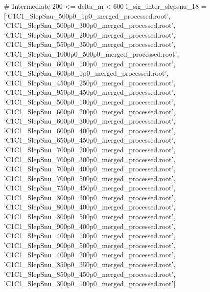 # Intermediate 200 <= delta_m < 600
l_sig_inter_slepsnu_18 = ['C1C1_SlepSnu_500p0_1p0_merged_processed.root',
                       'C1C1_SlepSnu_500p0_300p0_merged_processed.root',
                       'C1C1_SlepSnu_500p0_200p0_merged_processed.root',
                       'C1C1_SlepSnu_550p0_350p0_merged_processed.root',
                       'C1C1_SlepSnu_1000p0_500p0_merged_processed.root',
                       'C1C1_SlepSnu_600p0_100p0_merged_processed.root',
                       'C1C1_SlepSnu_600p0_1p0_merged_processed.root',
                       'C1C1_SlepSnu_450p0_250p0_merged_processed.root',
                       'C1C1_SlepSnu_950p0_450p0_merged_processed.root',
                       'C1C1_SlepSnu_500p0_100p0_merged_processed.root',
                       'C1C1_SlepSnu_600p0_200p0_merged_processed.root',
                       'C1C1_SlepSnu_600p0_300p0_merged_processed.root',
                       'C1C1_SlepSnu_600p0_400p0_merged_processed.root',
                       'C1C1_SlepSnu_650p0_450p0_merged_processed.root',
                       'C1C1_SlepSnu_700p0_200p0_merged_processed.root',
                       'C1C1_SlepSnu_700p0_300p0_merged_processed.root',
                       'C1C1_SlepSnu_700p0_400p0_merged_processed.root',
                       'C1C1_SlepSnu_700p0_500p0_merged_processed.root',
                       'C1C1_SlepSnu_750p0_450p0_merged_processed.root',
                       'C1C1_SlepSnu_800p0_300p0_merged_processed.root',
                       'C1C1_SlepSnu_800p0_400p0_merged_processed.root',
                       'C1C1_SlepSnu_800p0_500p0_merged_processed.root',
                       'C1C1_SlepSnu_900p0_400p0_merged_processed.root',
                       'C1C1_SlepSnu_400p0_100p0_merged_processed.root',
                       'C1C1_SlepSnu_900p0_500p0_merged_processed.root',
                       'C1C1_SlepSnu_400p0_200p0_merged_processed.root',
                       'C1C1_SlepSnu_850p0_350p0_merged_processed.root',
                       'C1C1_SlepSnu_850p0_450p0_merged_processed.root',
                       'C1C1_SlepSnu_300p0_100p0_merged_processed.root']



